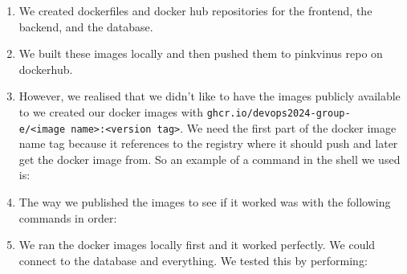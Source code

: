 \begin{enumerate}
    \item We created dockerfiles and docker hub repositories for the frontend, the backend, and the database.
    \item We built these images locally and then pushed them to pinkvinus repo on dockerhub.
    \item However, we realised that we didn't like to have the images publicly available to we created our docker images with \texttt{ghcr.io/devops2024-group-e/\textless{}image\ name\textgreater{}:\textless{}version\ tag\textgreater{}}. We need the first part of the docker image name tag because it references to the registry where it should push and later get the docker image from. So an example of a command in the shell we used is:

    \item The way we published the images to see if it worked was with the following commands in order:



    \item We ran the docker images locally first and it worked perfectly. We could connect to the database and everything. We tested this by performing:


\end{enumerate}
